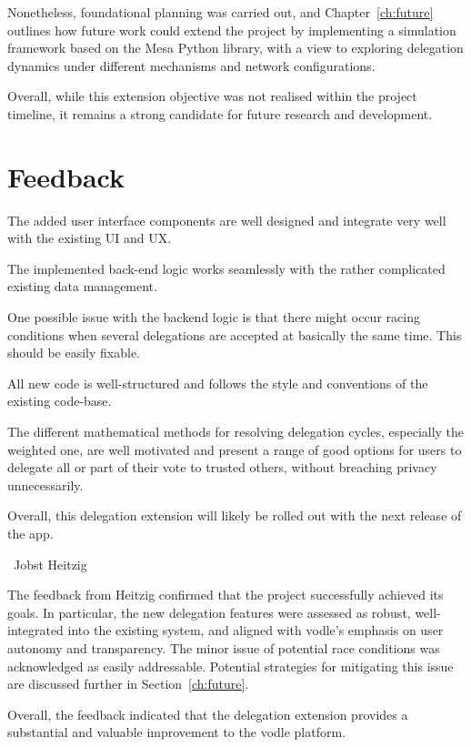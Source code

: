 Nonetheless, foundational planning was carried out, and Chapter~\ref{ch:future} outlines how future work could extend the project by implementing a simulation framework based on the Mesa Python library, with a view to exploring delegation dynamics under different mechanisms and network configurations.

Overall, while this extension objective was not realised within the project timeline, it remains a strong candidate for future research and development.


\section{Feedback}
\label{sec:feedback}

\begin{displayquote}
    The added user interface components are well designed and integrate very well with the existing UI and UX.
    
    The implemented back-end logic works seamlessly with the rather complicated existing data management.
    
    One possible issue with the backend logic is that there might occur racing conditions when several delegations are accepted at basically the same time. This should be easily fixable.
    
    All new code is well-structured and follows the style and conventions of the existing code-base.
    
    The different mathematical methods for resolving delegation cycles, especially the weighted one, are well motivated and present a range of good options for users to delegate all or part of their vote to trusted others, without breaching privacy unnecessarily.
    
    Overall, this delegation extension will likely be rolled out with the next release of the app.
    \end{displayquote}
    
\begin{flushright}
\textemdash\ Jobst Heitzig
\end{flushright}
    

The feedback from Heitzig confirmed that the project successfully achieved its goals. In particular, the new delegation features were assessed as robust, well-integrated into the existing system, and aligned with vodle's emphasis on user autonomy and transparency. The minor issue of potential race conditions was acknowledged as easily addressable. Potential strategies for mitigating this issue are discussed further in Section~\ref{ch:future}.

Overall, the feedback indicated that the delegation extension provides a substantial and valuable improvement to the vodle platform.